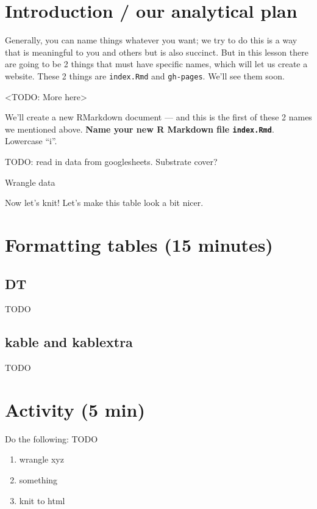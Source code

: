 \documentclass[]{book}
\providecommand{\tightlist}{%
  \setlength{\itemsep}{0pt}\setlength{\parskip}{0pt}}
\begin{document}
\hypertarget{introduction-our-analytical-plan-1}{%
\section{Introduction / our analytical plan}\label{introduction-our-analytical-plan-1}}

Generally, you can name things whatever you want; we try to do this is a way that is meaningful to you and others but is also succinct. But in this lesson there are going to be 2 things that must have specific names, which will let us create a website. These 2 things are \texttt{index.Rmd} and \texttt{gh-pages}. We'll see them soon.

\textless{}TODO: More here\textgreater{}

We'll create a new RMarkdown document --- and this is the first of these 2 names we mentioned above. \textbf{Name your new R Markdown file \texttt{index.Rmd}}. Lowercase ``i''.

TODO: read in data from googlesheets. Substrate cover?

Wrangle data

Now let's knit! Let's make this table look a bit nicer.

\hypertarget{formatting-tables-15-minutes}{%
\section{Formatting tables (15 minutes)}\label{formatting-tables-15-minutes}}

\hypertarget{dt}{%
\subsection{DT}\label{dt}}

TODO

\hypertarget{kable-and-kablextra}{%
\subsection{kable and kablextra}\label{kable-and-kablextra}}

TODO

\hypertarget{activity-5-min}{%
\section{Activity (5 min)}\label{activity-5-min}}

Do the following:
TODO

\begin{enumerate}
\def\labelenumi{\arabic{enumi}.}
\tightlist
\item
  wrangle xyz
\item
  something
\item
  knit to html
\end{enumerate}
\end{document}
